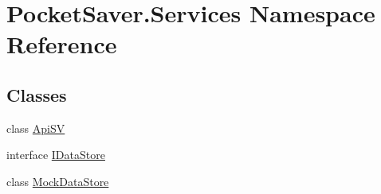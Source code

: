 \hypertarget{namespace_pocket_saver_1_1_services}{}\section{Pocket\+Saver.\+Services Namespace Reference}
\label{namespace_pocket_saver_1_1_services}
\subsection*{Classes}
\begin{DoxyCompactItemize}
\item 
class \hyperlink{class_pocket_saver_1_1_services_1_1_api_s_v}{Api\+SV}
\item 
interface \hyperlink{interface_pocket_saver_1_1_services_1_1_i_data_store}{I\+Data\+Store}
\item 
class \hyperlink{class_pocket_saver_1_1_services_1_1_mock_data_store}{Mock\+Data\+Store}
\end{DoxyCompactItemize}
